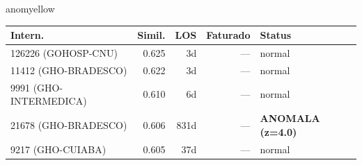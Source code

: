 \documentclass[a4paper,10pt]{article}
\begin{document}
\begin{anomalycard}[Internacao 165511 | GHO-PETROBRAS | MODERADO (z=2.09)]{anomyellow}
\begin{tabular}{l r r r l}\toprule\textbf{Intern.} & \textbf{Simil.} & \textbf{LOS} & \textbf{Faturado} & \textbf{Status} \\\midrule
126226 (GOHOSP-CNU) & 0.625 & 3d & --- & \textcolor{jcubeblue}{normal} \\
11412 (GHO-BRADESCO) & 0.622 & 3d & --- & \textcolor{jcubeblue}{normal} \\
9991 (GHO-INTERMEDICA) & 0.610 & 6d & --- & \textcolor{jcubeblue}{normal} \\
21678 (GHO-BRADESCO) & 0.606 & 831d & --- & \textcolor{anomred}{\textbf{ANOMALA (z=4.0)}} \\
9217 (GHO-CUIABA) & 0.605 & 37d & --- & \textcolor{jcubeblue}{normal} \\
\bottomrule\end{tabular}


\end{anomalycard}

\newpage
\end{document}
